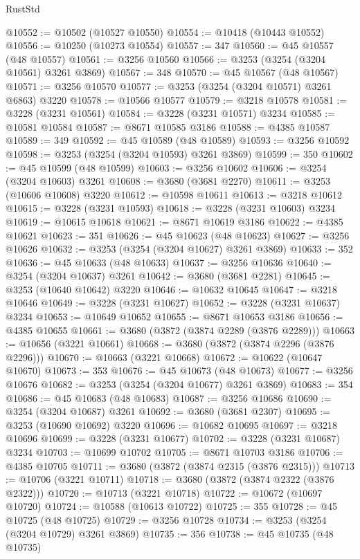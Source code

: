 \begin{lexlean}{RustStd}
\begin{coremodule}
@10552 := @10502 (@10527 @10550)
@10554 := @10418 (@10443 @10552)
@10556 := @10250 (@10273 @10554)
@10557 := 347
@10560 := @45 @10557 (@48 @10557)
@10561 := @3256 @10560
@10566 := @3253 (@3254 (@3204 @10561) @3261 @3869)
@10567 := 348
@10570 := @45 @10567 (@48 @10567)
@10571 := @3256 @10570
@10577 := @3253 (@3254 (@3204 @10571) @3261 @6863) @3220
@10578 := @10566 @10577
@10579 := @3218 @10578
@10581 := @3228 (@3231 @10561)
@10584 := @3228 (@3231 @10571) @3234
@10585 := @10581 @10584
@10587 := @8671 @10585 @3186
@10588 := @4385 @10587
@10589 := 349
@10592 := @45 @10589 (@48 @10589)
@10593 := @3256 @10592
@10598 := @3253 (@3254 (@3204 @10593) @3261 @3869)
@10599 := 350
@10602 := @45 @10599 (@48 @10599)
@10603 := @3256 @10602
@10606 := @3254 (@3204 @10603) @3261
@10608 := @3680 (@3681 @2270)
@10611 := @3253 (@10606 @10608) @3220
@10612 := @10598 @10611
@10613 := @3218 @10612
@10615 := @3228 (@3231 @10593)
@10618 := @3228 (@3231 @10603) @3234
@10619 := @10615 @10618
@10621 := @8671 @10619 @3186
@10622 := @4385 @10621
@10623 := 351
@10626 := @45 @10623 (@48 @10623)
@10627 := @3256 @10626
@10632 := @3253 (@3254 (@3204 @10627) @3261 @3869)
@10633 := 352
@10636 := @45 @10633 (@48 @10633)
@10637 := @3256 @10636
@10640 := @3254 (@3204 @10637) @3261
@10642 := @3680 (@3681 @2281)
@10645 := @3253 (@10640 @10642) @3220
@10646 := @10632 @10645
@10647 := @3218 @10646
@10649 := @3228 (@3231 @10627)
@10652 := @3228 (@3231 @10637) @3234
@10653 := @10649 @10652
@10655 := @8671 @10653 @3186
@10656 := @4385 @10655
@10661 := @3680 (@3872 (@3874 @2289 (@3876 @2289)))
@10663 := @10656 (@3221 @10661)
@10668 := @3680 (@3872 (@3874 @2296 (@3876 @2296)))
@10670 := @10663 (@3221 @10668)
@10672 := @10622 (@10647 @10670)
@10673 := 353
@10676 := @45 @10673 (@48 @10673)
@10677 := @3256 @10676
@10682 := @3253 (@3254 (@3204 @10677) @3261 @3869)
@10683 := 354
@10686 := @45 @10683 (@48 @10683)
@10687 := @3256 @10686
@10690 := @3254 (@3204 @10687) @3261
@10692 := @3680 (@3681 @2307)
@10695 := @3253 (@10690 @10692) @3220
@10696 := @10682 @10695
@10697 := @3218 @10696
@10699 := @3228 (@3231 @10677)
@10702 := @3228 (@3231 @10687) @3234
@10703 := @10699 @10702
@10705 := @8671 @10703 @3186
@10706 := @4385 @10705
@10711 := @3680 (@3872 (@3874 @2315 (@3876 @2315)))
@10713 := @10706 (@3221 @10711)
@10718 := @3680 (@3872 (@3874 @2322 (@3876 @2322)))
@10720 := @10713 (@3221 @10718)
@10722 := @10672 (@10697 @10720)
@10724 := @10588 (@10613 @10722)
@10725 := 355
@10728 := @45 @10725 (@48 @10725)
@10729 := @3256 @10728
@10734 := @3253 (@3254 (@3204 @10729) @3261 @3869)
@10735 := 356
@10738 := @45 @10735 (@48 @10735)

\end{coremodule}
\end{lexlean}

